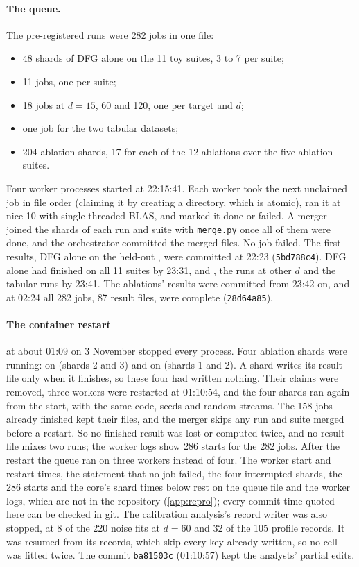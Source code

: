 \paragraph{The queue.} The pre-registered runs were 282 jobs in one file:
\begin{itemize}
\item 48 shards of DFG alone on the 11 toy suites, 3 to 7 per suite;
\item 11  jobs, one per suite;
\item 18 jobs at $d=15$, 60 and 120, one per target and $d$;
\item one job for the two tabular datasets;
\item 204 ablation shards, 17 for each of the 12 ablations over the five ablation suites.
\end{itemize}
Four worker processes started at 22:15:41. Each worker took the next unclaimed job in file order (claiming it by creating a directory, which is atomic), ran it at nice 10 with single-threaded BLAS, and marked it done or failed. A merger joined the shards of each run and suite with \texttt{merge.py} once all of them were done, and the orchestrator committed the merged files. No job failed. The first results, DFG alone on the held-out , were committed at 22:23 (\texttt{5bd788c4}). DFG alone had finished on all 11 suites by 23:31, and , the runs at other $d$ and the tabular runs by 23:41. The ablations' results were committed from 23:42 on, and at 02:24 all 282 jobs, 87 result files, were complete (\texttt{28d64a85}).

\paragraph{The container restart} at about 01:09 on 3 November stopped every process. Four ablation shards were running:  on  (shards 2 and 3) and on  (shards 1 and 2). A shard writes its result file only when it finishes, so these four had written nothing. Their claims were removed, three workers were restarted at 01:10:54, and the four shards ran again from the start, with the same code, seeds and random streams. The 158 jobs already finished kept their files, and the merger skips any run and suite merged before a restart. So no finished result was lost or computed twice, and no result file mixes two runs; the worker logs show 286 starts for the 282 jobs. After the restart the queue ran on three workers instead of four. The worker start and restart times, the statement that no job failed, the four interrupted shards, the 286 starts and the core's shard times below rest on the queue file and the worker logs, which are not in the repository (\cref{app:repro}); every commit time quoted here can be checked in git. The calibration analysis's record writer was also stopped, at 8 of the 220 noise fits at $d=60$ and 32 of the 105 profile records. It was resumed from its records, which skip every key already written, so no cell was fitted twice. The commit \texttt{ba81503c} (01:10:57) kept the analysts' partial edits.

